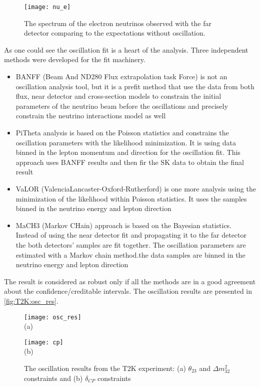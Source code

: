 \documentclass[../main.tex]{subfiles}
\begin{document}
\begin{figure}[ht!]
  \centering
  \texttt{[image: nu\_e]}
  \caption{The spectrum of the electron neutrinos observed with the far detector comparing to the expectations without oscillation.}
  \label{fig:t2k:nu_e}
\end{figure}

As one could see the oscillation fit is a heart of the analysis. Three independent methods were developed for the fit machinery.
\begin{itemize}
  \item BANFF (Beam And ND280 Flux extrapolation task Force) is not an oscillation analysis tool, but it is a prefit method that use the data from both flux, near detector and cross-section models to constrain the initial parameters of the neutrino beam before the oscillations and precisely constrain the neutrino interactions model as well
  \item PiTheta analysis is based on the Poisson statistics and constrains the oscillation parameters with the likelihood minimization. It is using data binned in the lepton momentum and direction for the oscillation fit. This approach uses BANFF results and then fir the SK data to obtain the final result
  \item VaLOR (ValenciaLancaster-Oxford-Rutherford) is one more analysis using the minimization of the likelihood within Poisson statistics. It uses the samples binned in the neutrino energy and lepton direction
  \item MaCH3 (Markov CHain) approach is based on the Bayesian statistics. Instead of using the near detector fit and propagating it to the far detector the both detectors' samples are fit together. The oscillation parameters are estimated with a Markov chain method.the data samples are binned in the neutrino energy and lepton direction
\end{itemize}

The result is considered as robust only if all the methods are in a good agreement about the confidence/creditable intervals. The oscillation results are presented in \autoref{fig:T2K:osc_res}.

\begin{figure}[h!]
  \centering
  \begin{minipage}{0.49\linewidth}
    \centering
    \texttt{[image: osc\_res]} \\ (a)
  \end{minipage}
  \begin{minipage}{0.49\linewidth}
    \centering
    \texttt{[image: cp]} \\ (b)
  \end{minipage}
    \caption{The oscillation results from the T2K experiment: (a) $\theta_{23}$ and $\Delta m_{32}^2$ constraints and (b) $\delta_{CP}$ constraints}
    \label{fig:T2K:osc_res}
\end{figure}
\end{document}
